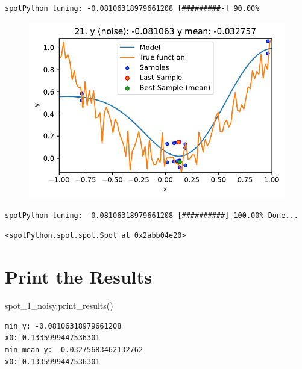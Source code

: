\documentclass[
  letterpaper,
  DIV=11,
  numbers=noendperiod]{scrreprt}
\newenvironment{Shaded}{\begin{snugshade}}{\end{snugshade}}
\newcommand{\NormalTok}[1]{\textcolor[rgb]{0.00,0.23,0.31}{#1}}
\begin{document}
\begin{verbatim}
spotPython tuning: -0.08106318979661208 [#########-] 90.00% 
\end{verbatim}

\begin{figure}[H]

{\centering \includegraphics{09_spot_ocba_files/figure-pdf/cell-6-output-10.pdf}

}

\end{figure}

\begin{verbatim}
spotPython tuning: -0.08106318979661208 [##########] 100.00% Done...
\end{verbatim}

\begin{verbatim}
<spotPython.spot.spot.Spot at 0x2abb04e20>
\end{verbatim}

\hypertarget{print-the-results-4}{%
\section{Print the Results}\label{print-the-results-4}}

\begin{Shaded}
\begin{Highlighting}[]
\NormalTok{spot\_1\_noisy.print\_results()}
\end{Highlighting}
\end{Shaded}

\begin{verbatim}
min y: -0.08106318979661208
x0: 0.1335999447536301
min mean y: -0.03275683462132762
x0: 0.1335999447536301
\end{verbatim}
\end{document}
